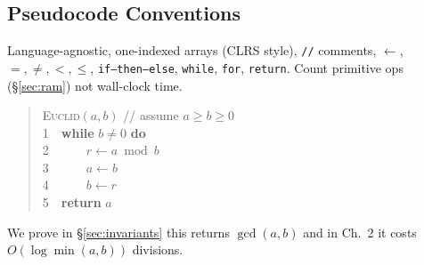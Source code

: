 \subsection{Pseudocode Conventions} Language-agnostic, one-indexed arrays (CLRS style), \texttt{//} comments, $\gets$, $=,\neq,<,\le$, \texttt{if--then--else}, \texttt{while}, \texttt{for}, \texttt{return}. Count primitive ops (\S\ref{sec:ram}) not wall-clock time.
\begin{example}
\begin{quote}\ttfamily\scriptsize
\textsc{Euclid}$(a,b)$ // assume $a\ge b\ge0$\\
1\ \ \textbf{while} $b\neq0$ \textbf{do}\\
2\ \ \ \ \ \ $r \gets a \bmod b$\\
3\ \ \ \ \ \ $a \gets b$\\
4\ \ \ \ \ \ $b \gets r$\\
5\ \ \textbf{return} $a$
\end{quote}
We prove in \S\ref{sec:invariants} this returns $\gcd(a,b)$ and in Ch.~2 it costs $O(\log\min(a,b))$ divisions.
\end{example}

